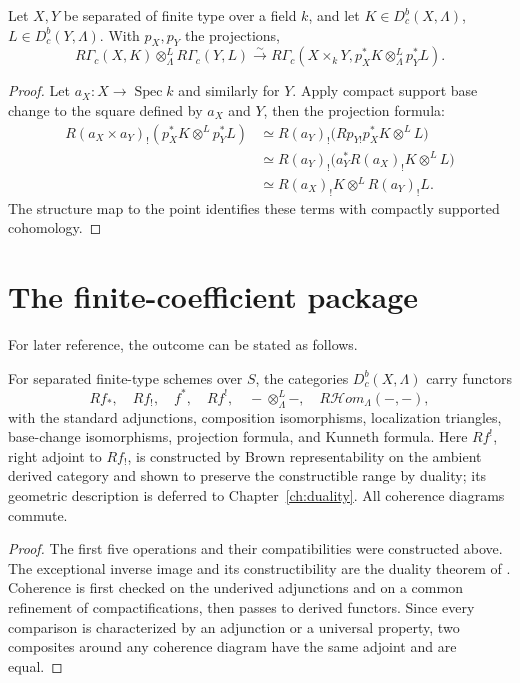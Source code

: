 \begin{theorem}
\label{thm:kunneth-torsion}
Let \(X,Y\) be separated of finite type over a field \(k\), and let
\(K\in D^b_c(X,\Lambda)\), \(L\in D^b_c(Y,\Lambda)\).  With
\(p_X,p_Y\) the projections,
\[
 R\Gamma_c(X,K)\otimes_\Lambda^L R\Gamma_c(Y,L)
 \xrightarrow{\sim}
 R\Gamma_c\!\left(X\times_kY,
 p_X^*K\otimes_\Lambda^L p_Y^*L\right).
\]
\end{theorem}

\begin{proof}
Let \(a_X:X\to\operatorname{Spec}k\) and similarly for \(Y\).  Apply compact
support base change to the square defined by \(a_X\) and \(Y\), then the
projection formula:
\[
\begin{aligned}
R(a_X\times a_Y)_!
 (p_X^*K\otimes^Lp_Y^*L)
&\simeq
R(a_Y)_!\bigl(Rp_{Y!}p_X^*K\otimes^LL\bigr)\\
&\simeq
R(a_Y)_!\bigl(a_Y^*R(a_X)_!K\otimes^LL\bigr)\\
&\simeq R(a_X)_!K\otimes^LR(a_Y)_!L.
\end{aligned}
\]
The structure map to the point identifies these terms with compactly
supported cohomology.
\end{proof}

\section{The finite-coefficient package}

For later reference, the outcome can be stated as follows.

\begin{theorem}
For separated finite-type schemes over \(S\), the categories
\(D^b_c(X,\Lambda)\) carry functors
\[
  Rf_*,\quad Rf_!,\quad f^*,\quad Rf^!,
  \quad -\otimes_\Lambda^L-,\quad R\mathcal Hom_\Lambda(-,-),
\]
with the standard adjunctions, composition isomorphisms, localization
triangles, base-change isomorphisms, projection formula, and Kunneth formula.
Here \(Rf^!\), right adjoint to \(Rf_!\), is constructed by Brown
representability on the ambient derived category and shown to preserve the
constructible range by duality; its geometric description is deferred to
Chapter~\ref{ch:duality}.  All coherence diagrams commute.
\end{theorem}

\begin{proof}
The first five operations and their compatibilities were constructed above.
The exceptional inverse image and its constructibility are the duality
theorem of \cite[Expos\'e XVIII]{SGA4}.  Coherence is first checked on the
underived adjunctions and on a common refinement of compactifications, then
passes to derived functors.  Since every comparison is characterized by an
adjunction or a universal property, two composites around any coherence
diagram have the same adjoint and are equal.
\end{proof}

